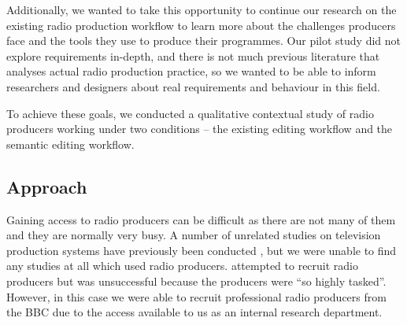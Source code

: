 Additionally, we wanted to take this opportunity to continue our research on the existing radio production workflow to
learn more about the challenges producers face and the tools they use to produce their programmes. Our pilot study did
not explore requirements in-depth, and there is not much previous literature that analyses actual radio production
practice, so we wanted to be able to inform researchers and designers about real requirements and behaviour in this
field.

To achieve these goals, we conducted a qualitative contextual study of radio producers working under two conditions --
the existing editing workflow and the semantic editing workflow.


\subsection{Approach}
Gaining access to radio producers can be difficult as there are not many of them and they are normally very busy. A
number of unrelated studies on television production systems have previously been conducted
\citep{Engstroem2010,Perry2009}, but we were unable to find any studies at all which used radio producers.
\citet{Kim2003} attempted to recruit radio producers but was unsuccessful because the producers were ``so highly
tasked''. However, in this case we were able to recruit professional radio producers from the BBC due to the access
available to us as an internal research department.

